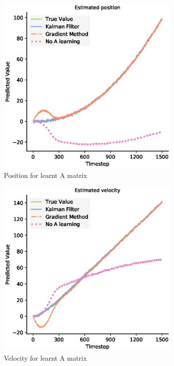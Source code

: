 \begin{figure}[H]
 \begin{subfigure}{0.32\textwidth}
 \centering
 \includegraphics[width=.8\linewidth]{chapter_3_figures/Estimated_position_A_matrix.eps}
 \caption{Position for learnt A matrix}
 \end{subfigure}%
 \begin{subfigure}{0.32\textwidth}
 \centering
 \includegraphics[width=.8\linewidth]{chapter_3_figures/Estimated_velocity_A_matrix.eps}
 \caption{Velocity for learnt A matrix}
 \end{subfigure}
 \begin{subfigure}{0.32\textwidth}\quad

\end{subfigure}
\end{figure}
